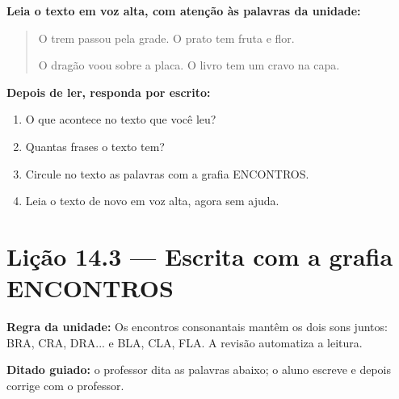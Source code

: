 \noindent\textbf{Leia o texto em voz alta, com atenção às palavras da unidade:}


\begin{quote}
O trem passou pela grade. O prato tem fruta e flor.

O dragão voou sobre a placa. O livro tem um cravo na capa.
\end{quote}

\textbf{Depois de ler, responda por escrito:}
\begin{enumerate}

  \item O que acontece no texto que você leu?
  \begin{center}
  \underline{\hspace{12cm}}
  \end{center}

  \item Quantas frases o texto tem?
  \begin{center}
  \underline{\hspace{12cm}}
  \end{center}

  \item Circule no texto as palavras com a grafia ENCONTROS.

  \item Leia o texto de novo em voz alta, agora sem ajuda.

\end{enumerate}

\section{Lição 14.3 --- Escrita com a grafia ENCONTROS}

\noindent\textbf{Regra da unidade:} Os encontros consonantais mantêm os dois sons juntos: BRA, CRA, DRA... e BLA, CLA, FLA. A revisão automatiza a leitura.


\noindent\textbf{Ditado guiado:} o professor dita as palavras abaixo; o aluno escreve e depois corrige com o professor.

\begin{center}
  \underline{\hspace{2.3cm}} \quad \underline{\hspace{2.3cm}} \quad \underline{\hspace{2.3cm}} \quad \underline{\hspace{2.3cm}}

  \underline{\hspace{2.3cm}} \quad \underline{\hspace{2.3cm}} \quad \underline{\hspace{2.3cm}} \quad \underline{\hspace{2.3cm}}
\end{center}

